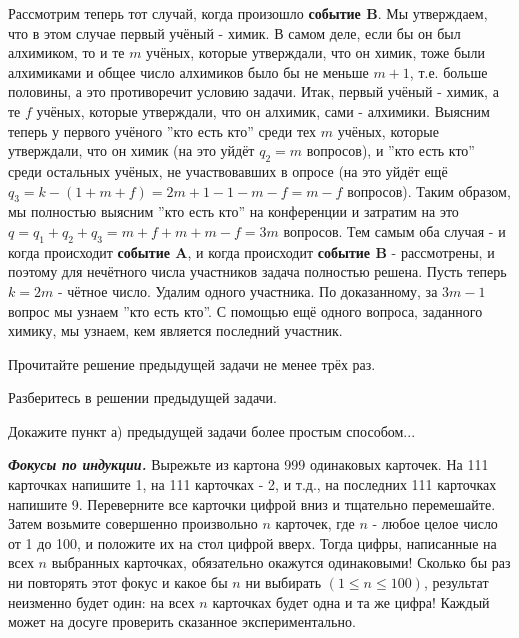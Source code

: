 \begin{prf}
    Рассмотрим теперь тот случай, когда произошло \textbf{событие B}. Мы утверждаем, что в этом случае первый учёный - химик. В самом деле, если бы он был алхимиком, то и те $m$ учёных, которые утверждали, что он химик, тоже были алхимиками и общее число алхимиков было бы не меньше $m + 1$, т.е. больше половины, а это противоречит условию задачи. Итак, первый учёный - химик, а те $f$ учёных, которые утверждали, что он алхимик, сами - алхимики. Выясним теперь у первого учёного ''кто есть кто'' среди тех $m$ учёных, которые утверждали, что он химик (на это уйдёт $q_2 = m$ вопросов), и ''кто есть кто'' среди остальных учёных, не участвовавших в опросе (на это уйдёт ещё $q_3 = k - (1 + m + f) = 2m + 1 - 1 - m - f = m - f$ вопросов). Таким образом, мы полностью выясним ''кто есть кто'' на конференции и затратим на это $q = q_1 + q_2 + q_3 = m + f + m + m - f = 3m$ вопросов. Тем самым оба случая - и когда происходит \textbf{событие A}, и когда происходит \textbf{событие B} - рассмотрены, и поэтому для нечётного числа участников задача полностью решена. Пусть теперь $k = 2m$ - чётное число. Удалим одного участника. По доказанному, за $3m-1$ вопрос мы узнаем ''кто есть кто''. С помощью ещё одного вопроса, заданного химику, мы узнаем, кем является последний участник.
\end{prf}

\begin{ex}
    Прочитайте решение предыдущей задачи не менее трёх раз.
\end{ex}

\begin{ex}
    Разберитесь в решении предыдущей задачи.
\end{ex}

\begin{thm}
    Докажите пункт а) предыдущей задачи более простым способом...
\end{thm}

\par

\textbf{\textit{Фокусы по индукции.}} Вырежьте из картона 999 одинаковых карточек. На 111 карточках напишите 1, на 111 карточках - 2, и т.д., на последних 111 карточках напишите 9. Переверните все карточки цифрой вниз и тщательно перемешайте. Затем возьмите совершенно произвольно $n$ карточек, где $n$ - любое целое число от 1 до 100, и положите их на стол цифрой вверх. Тогда цифры, написанные на всех $n$ выбранных карточках, обязательно окажутся одинаковыми! Сколько бы раз ни повторять этот фокус и какое бы $n$ ни выбирать $(1 \leq n \leq 100)$, результат неизменно будет один: на всех $n$ карточках будет одна и та же цифра! Каждый может на досуге проверить сказанное экспериментально.

